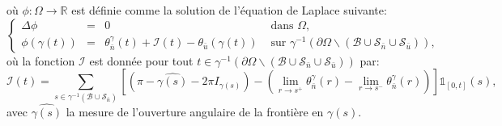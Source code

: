 où $\phi:\Omega\longrightarrow\mathbb{R}$ est définie comme la solution de l'équation de Laplace suivante:
\begin{equation}
\left\{
\begin{array}{lcll}
\Delta\phi &=& 0 &\mbox{ dans }\Omega,\\[0.5cm]
\phi(\gamma(t))&=&\theta_{\bar{n}}^\gamma(t)+\mathcal{I}(t)-\theta_{\bar{u}}(\gamma(t))& \mbox{ sur } \gamma^{-1}(\partial\Omega\backslash(\mathcal{B}\cup\mathcal{S}_{\bar{n}}\cup\mathcal{S}_{\bar{u}})),
\end{array}
\right.
\label{eqn:principe_def_phi}
\end{equation}
où la fonction $\mathcal{I}$ est donnée pour tout $t\in\gamma^{-1}(\partial\Omega\backslash(\mathcal{B}\cup\mathcal{S}_{\bar{n}}\cup\mathcal{S}_{\bar{u}}))$ par:
$$
\mathcal{I}(t)=\sum_{s\in\gamma^{-1}(\mathcal{B}\cup\mathcal{S}_{\bar{n}})}\left[\left(\pi-\widehat{\gamma(s)}-2\pi I_{\gamma(s)}\right)-\left(\lim\limits_{r\rightarrow s^+}\theta^{\gamma}_{\bar{n}}(r) - \lim\limits_{r\rightarrow s^-}\theta^{\gamma}_{\bar{n}}(r)\right)\right]\mathbb{1}_{[0, t]}(s),
$$
avec $\widehat{\gamma(s)}$ la mesure de l'ouverture angulaire de la frontière en $\gamma(s)$.

